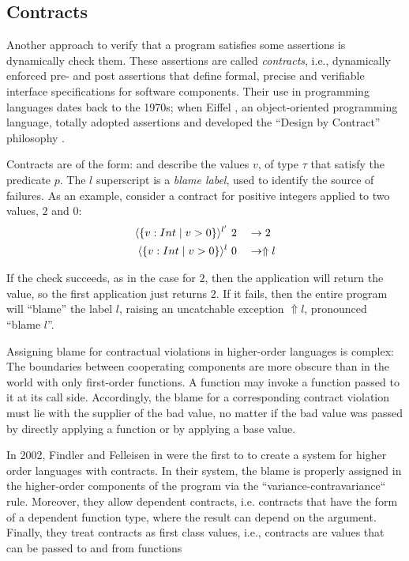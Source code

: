 \subsection{Contracts}


Another approach to verify that a program satisfies some 
assertions is dynamically check them.
% 
These assertions are called \textit{contracts}, i.e., 
dynamically enforced pre- and post assertions that
define formal, precise and verifiable interface specifications 
for software components.
%	
Their use in programming languages dates back to the 1970s; 
when Eiffel \cite{Eiffel}, an object-oriented programming language,
totally adopted assertions and developed the 
``Design by Contract'' philosophy \cite{Meyer92}.

Contracts are of the form:
and describe the values $v$, of type $\tau$
that satisfy the predicate $p$. 
The $l$ superscript is a \textit{blame label}, used to
identify the source of failures.
%
As an example, 
consider a contract for positive integers 
applied to two values, $2$ and $0$: 
\begin{align*}
\langle\{v : Int \mid v>0 \}\rangle^{l'}&\ 2 &&\rightarrow 2 \\
\langle\{v : Int \mid v>0 \}\rangle^{l}&\ 0  &&\rightarrow \Uparrow l
\end{align*}

If the check succeeds, as in the case for $2$,
then the application will return the value, so the first 
application just returns $2$.
If it fails, then the entire program will ``blame'' the label $l$,
raising an uncatchable exception  $\Uparrow l$, pronounced ``blame $l$''.

Assigning blame for contractual violations in higher-order languages
is complex:
%
The boundaries between cooperating components are more obscure 
than in the world with only first-order functions. 
A function may invoke a function passed to it at its call side.
Accordingly, the blame for a corresponding contract violation must 
lie with the supplier of the bad value, 
no matter if the bad value was passed by directly applying 
a function or by applying a base value.
%

In 2002, Findler and Felleisen in \cite{Findler02} were the first to
to create a system for higher order languages with contracts.
%
In their system, the blame is properly assigned in the 
higher-order components of the program via the 
``variance-contravariance`` rule.
Moreover,
they allow dependent contracts, i.e. 
contracts that have the form of a dependent function type, 
where the result can depend on the argument.
Finally,
they treat contracts as first class values, 
i.e., contracts are values that can be passed to and from functions

